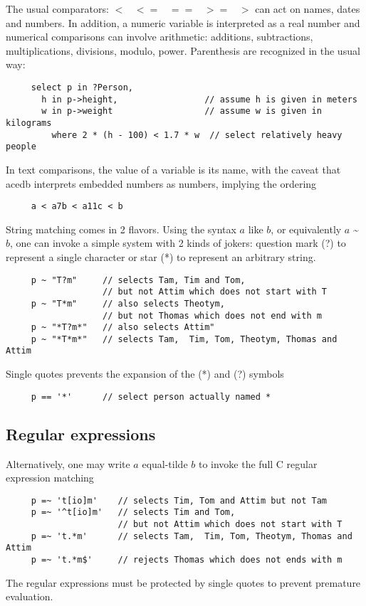 \documentclass[11pt]{article}
\newcommand{\BL}{\begin{lstlisting}}
\begin{document}
The usual comparators: 
$< \;\;\; <= \;\;\;  ==  \;\;\; >=  \;\;\; >$
can act on names, dates and numbers. In addition, a numeric variable is interpreted as a real number  
and numerical comparisons can involve arithmetic: additions, subtractions, multiplications, divisions, 
modulo, power.  Parenthesis are recognized in the usual way:
\BL
     select p in ?Person, 
       h in p->height,                 // assume h is given in meters
       w in p->weight                  // assume w is given in kilograms
         where 2 * (h - 100) < 1.7 * w  // select relatively heavy people
\end{lstlisting}

In text comparisons, the value of a variable is its name, with the caveat that acedb interprets 
embedded numbers as numbers, implying the ordering
\BL
     a < a7b < a11c < b
\end{lstlisting}

String matching comes in 2 flavors. Using the syntax $a$ like $b$, or equivalently
$a$ \~{} $b$, one can invoke a simple system 
with 2 kinds of jokers: 
question mark (?) to represent a single character or star (*) to represent an arbitrary string. 
\BL
     p ~ "T?m"     // selects Tam, Tim and Tom, 
                   // but not Attim which does not start with T
     p ~ "T*m"     // also selects Theotym, 
                   // but not Thomas which does not end with m
     p ~ "*T?m*"   // also selects Attim"
     p ~ "*T*m*"   // selects Tam,  Tim, Tom, Theotym, Thomas and  Attim
\end{lstlisting}
Single quotes prevents the expansion of the (*) and (?) symbols
\BL
     p == '*'      // select person actually named *
\end{lstlisting}

\subsection{Regular expressions}
Alternatively, one may write $a$ equal-tilde $b$ to invoke the full C regular expression matching 
\BL
     p =~ 't[io]m'    // selects Tim, Tom and Attim but not Tam
     p =~ '^t[io]m'   // selects Tim and Tom, 
                      // but not Attim which does not start with T
     p =~ 't.*m'      // selects Tam,  Tim, Tom, Theotym, Thomas and  Attim
     p =~ 't.*m$'     // rejects Thomas which does not ends with m
\end{lstlisting}
The regular expressions must be protected by single quotes to prevent premature evaluation.
\end{document}
